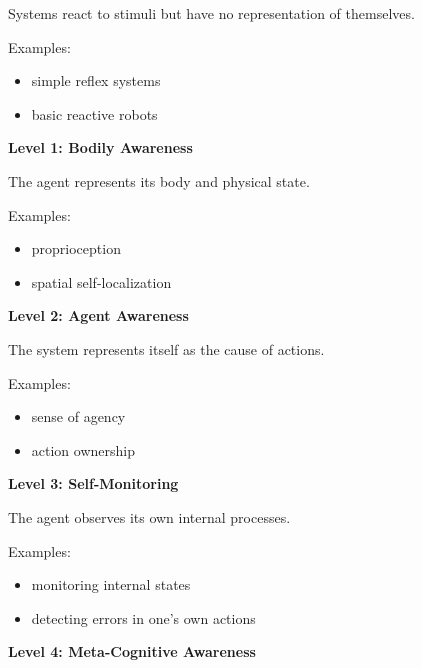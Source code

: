 \documentclass{book}
\providecommand{\ProjectDeepHeading}[2]{%
    \par\medskip\noindent\textbf{#2}\par\smallskip
}
\begin{document}
            Systems react to stimuli but have no representation of themselves.
            
            Examples:
            
            \begin{itemize}
                \item simple reflex systems
                \item basic reactive robots
            \end{itemize}
        
        \ProjectDeepHeading{7}{Level 1: Bodily Awareness}
            
            The agent represents its body and physical state.
            
            Examples:
            
            \begin{itemize}
                \item proprioception
                \item spatial self-localization
            \end{itemize}
        
        \ProjectDeepHeading{7}{Level 2: Agent Awareness}
            
            The system represents itself as the cause of actions.
            
            Examples:
            
            \begin{itemize}
                \item sense of agency
                \item action ownership
            \end{itemize}
        
        \ProjectDeepHeading{7}{Level 3: Self-Monitoring}
            
            The agent observes its own internal processes.
            
            Examples:
            
            \begin{itemize}
                \item monitoring internal states
                \item detecting errors in one's own actions
            \end{itemize}
        
        \ProjectDeepHeading{7}{Level 4: Meta-Cognitive Awareness}
            
\end{document}
